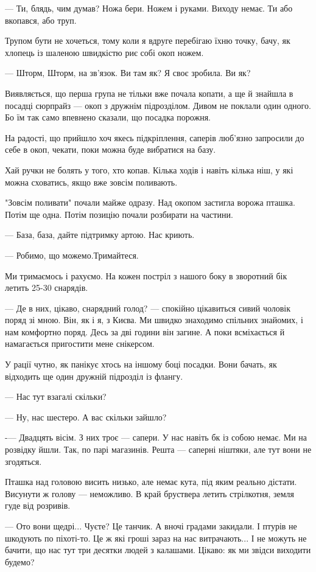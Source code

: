 — Ти, блядь, чим думав? Ножа бери. Ножем і руками. Виходу немає. Ти або
вкопався, або труп. 

Трупом бути не хочеться, тому коли я вдруге перебігаю їхню точку, бачу, як
хлопець із шаленою швидкістю риє собі окоп ножем. 

— Шторм, Шторм, на зв'язок. Ви там як? Я своє зробила. Ви як? 

Виявляється,  що перша група не тільки вже почала копати, а ще й знайшла в
посадці сюрпрайз — окоп з дружнім підрозділом.  Дивом не поклали один одного.
Бо їм так само впевнено сказали, що посадка порожня. 

На радості, що прийшло хоч якесь підкріплення, саперів люб'язно запросили до
себе в окоп, чекати, поки можна буде вибратися на базу. 

Хай ручки не болять у того, хто  копав. Кілька ходів і навіть кілька ніш, у які
можна сховатись, якщо вже зовсім поливають. 

"Зовсім поливати" почали майже одразу.  Над окопом застигла ворожа пташка.
Потім ще одна. Потім позицію почали розбирати на частини.

— База, база, дайте підтримку артою. Нас криють.

— Робимо, що можемо.Тримайтеся. 

Ми тримаємось і рахуємо. На кожен постріл з нашого боку в зворотний бік летить
25-30 снарядів.  

— Де в них, цікаво, снарядний голод? — спокійно цікавиться сивий чоловік поряд
зі мною. Він, як і я, з Києва. Ми швидко знаходимо спільних знайомих, і нам
комфортно поряд. Десь за дві години він загине. А поки всміхається й
намагається пригостити мене снікерсом. 

У рації чутно, як панікує хтось на іншому боці посадки. Вони бачать, як
відходить ще один дружній підрозділ із флангу. 

— Нас тут взагалі скільки? 

— Ну, нас шестеро. А вас скільки зайшло? 

-— Двадцять вісім. З них троє  —   сапери.  У нас навіть бк із собою немає. Ми
на розвідку йшли. Так, по парі магазинів. Решта — саперні ніштяки, але тут вони
не згодяться. 

Пташка над головою висить низько,  але немає кута, під яким реально дістати.
Висунути ж голову  —   неможливо. В край бруствера летить стрілкотня, земля
гуде від розривів. 

— Ото вони щедрі... Чуєте? Це танчик. А вночі градами закидали. І птурів не
шкодують по піхоті-то.  Це ж які гроші зараз на нас витрачають... І не можуть
не бачити, що нас тут три десятки людей з калашами. Цікаво: як ми звідси
виходити будемо? 

